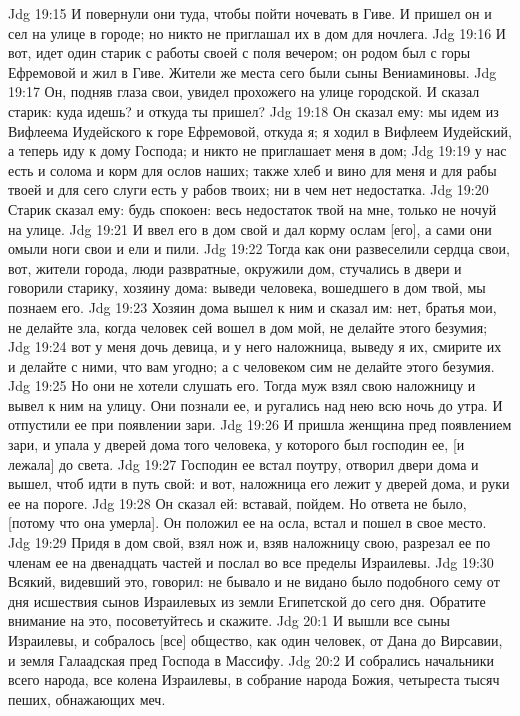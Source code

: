 Jdg 19:15  И повернули они туда, чтобы пойти ночевать в Гиве. И пришел он и сел на улице в городе; но никто не приглашал их в дом для ночлега.
Jdg 19:16  И вот, идет один старик с работы своей с поля вечером; он родом был с горы Ефремовой и жил в Гиве. Жители же места сего были сыны Вениаминовы.
Jdg 19:17  Он, подняв глаза свои, увидел прохожего на улице городской. И сказал старик: куда идешь? и откуда ты пришел?
Jdg 19:18  Он сказал ему: мы идем из Вифлеема Иудейского к горе Ефремовой, откуда я; я ходил в Вифлеем Иудейский, а теперь иду к дому Господа; и никто не приглашает меня в дом;
Jdg 19:19  у нас есть и солома и корм для ослов наших; также хлеб и вино для меня и для рабы твоей и для сего слуги есть у рабов твоих; ни в чем нет недостатка.
Jdg 19:20  Старик сказал ему: будь спокоен: весь недостаток твой на мне, только не ночуй на улице.
Jdg 19:21  И ввел его в дом свой и дал корму ослам [его], а сами они омыли ноги свои и ели и пили.
Jdg 19:22  Тогда как они развеселили сердца свои, вот, жители города, люди развратные, окружили дом, стучались в двери и говорили старику, хозяину дома: выведи человека, вошедшего в дом твой, мы познаем его.
Jdg 19:23  Хозяин дома вышел к ним и сказал им: нет, братья мои, не делайте зла, когда человек сей вошел в дом мой, не делайте этого безумия;
Jdg 19:24  вот у меня дочь девица, и у него наложница, выведу я их, смирите их и делайте с ними, что вам угодно; а с человеком сим не делайте этого безумия.
Jdg 19:25  Но они не хотели слушать его. Тогда муж взял свою наложницу и вывел к ним на улицу. Они познали ее, и ругались над нею всю ночь до утра. И отпустили ее при появлении зари.
Jdg 19:26  И пришла женщина пред появлением зари, и упала у дверей дома того человека, у которого был господин ее, [и лежала] до света.
Jdg 19:27  Господин ее встал поутру, отворил двери дома и вышел, чтоб идти в путь свой: и вот, наложница его лежит у дверей дома, и руки ее на пороге.
Jdg 19:28  Он сказал ей: вставай, пойдем. Но ответа не было, [потому что она умерла]. Он положил ее на осла, встал и пошел в свое место.
Jdg 19:29  Придя в дом свой, взял нож и, взяв наложницу свою, разрезал ее по членам ее на двенадцать частей и послал во все пределы Израилевы.
Jdg 19:30  Всякий, видевший это, говорил: не бывало и не видано было подобного сему от дня исшествия сынов Израилевых из земли Египетской до сего дня. Обратите внимание на это, посоветуйтесь и скажите.
Jdg 20:1  И вышли все сыны Израилевы, и собралось [все] общество, как один человек, от Дана до Вирсавии, и земля Галаадская пред Господа в Массифу.
Jdg 20:2  И собрались начальники всего народа, все колена Израилевы, в собрание народа Божия, четыреста тысяч пеших, обнажающих меч.
